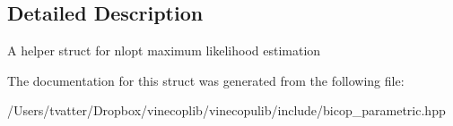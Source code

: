 \subsection{Detailed Description}
A helper struct for nlopt maximum likelihood estimation 

The documentation for this struct was generated from the following file\+:\begin{DoxyCompactItemize}
\item 
/\+Users/tvatter/\+Dropbox/vinecoplib/vinecopulib/include/bicop\+\_\+parametric.\+hpp\end{DoxyCompactItemize}

